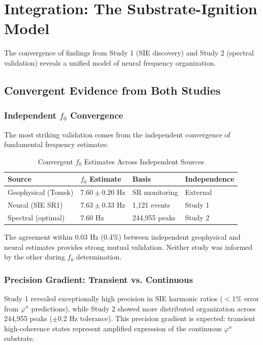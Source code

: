 \documentclass[11pt,a4paper]{article}
\newcommand{\phisym}{\varphi}
\begin{document}
\section{Integration: The Substrate-Ignition Model}

The convergence of findings from Study 1 (SIE discovery) and Study 2 (spectral validation) reveals a unified model of neural frequency organization.

\subsection{Convergent Evidence from Both Studies}

\subsubsection{Independent $f_0$ Convergence}
The most striking validation comes from the independent convergence of fundamental frequency estimates:

\begin{table}[H]
\centering
\caption{Convergent $f_0$ Estimates Across Independent Sources}
\label{tab:f0_convergence}
\begin{tabular}{@{}llll@{}}
\toprule
Source & $f_0$ Estimate & Basis & Independence \\
\midrule
Geophysical (Tomsk) & $7.60 \pm 0.20$ Hz & SR monitoring & External \\
Neural (SIE SR1) & $7.63 \pm 0.33$ Hz & 1,121 events & Study 1 \\
Spectral (optimal) & $7.60$ Hz & 244,955 peaks & Study 2 \\
\bottomrule
\end{tabular}
\end{table}

The agreement within 0.03 Hz (0.4\%) between independent geophysical and neural estimates provides strong mutual validation. Neither study was informed by the other during $f_0$ determination.

\subsubsection{Precision Gradient: Transient vs. Continuous}
Study 1 revealed exceptionally high precision in SIE harmonic ratios ($<1\%$ error from $\phisym^n$ predictions), while Study 2 showed more distributed organization across 244,955 peaks ($\pm 0.2$ Hz tolerance). This precision gradient is expected: transient high-coherence states represent amplified expression of the continuous $\phisym^n$ substrate.
\end{document}
